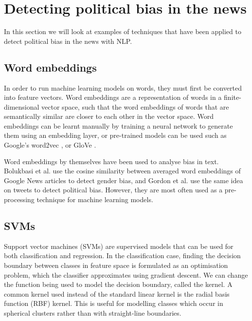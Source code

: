\section{Detecting political bias in the news} \label{sec:detecting-political-bias-in-news}

In this section we will look at examples of techniques that have been applied to detect political bias in the news with NLP.

\subsection{Word embeddings} \label{subsec:word-embeddings}

In order to run machine learning models on words, they must first be converted into feature vectors. Word embeddings are a representation of words in a finite-dimensional vector space, such that the word embeddings of words that are semantically similar are closer to each other in the vector space. Word embeddings can be learnt manually by training a neural network to generate them using an embedding layer, or pre-trained models can be used such as Google's word2vec \cite{word2vec}, or GloVe \cite{glove}.

Word embeddings by themselves have been used to analyse bias in text. Bolukbasi et al. \cite{gender-bias-word-embeddings} use the cosine similarity between averaged word embeddings of Google News articles to detect gender bias, and Gordon et al. \cite{political-bias-word-embeddings} use the same idea on tweets to detect political bias. However, they are most often used as a pre-processing technique for machine learning models.

\subsection{SVMs} \label{subsec:svms}

Support vector machines (SVMs) are supervised models that can be used for both classification and regression. In the classification case, finding the decision boundary between classes in feature space is formulated as an optimisation problem, which the classifier approximates using gradient descent. We can change the function being used to model the decision boundary, called the kernel. A common kernel used instead of the standard linear kernel is the radial basis function (RBF) kernel. This is useful for modelling classes which occur in spherical clusters rather than with straight-line boundaries.

